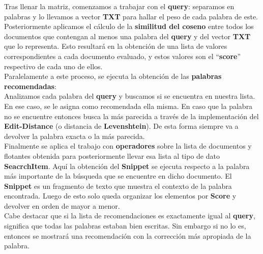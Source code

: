\documentclass[12pt,a4paper,onecolumn]{report}
\begin{document}
\begin{flushleft}
\begin{large}
Tras llenar la matriz, comenzamos a trabajar con el \textbf{query}:
separamos en palabras y lo llevamos a vector \textbf{TXT} para hallar el
peso de cada palabra de este. Posteriormente aplicamos el
cálculo de la \textbf{similitud del coseno} entre todos los documentos
que contengan al menos una palabra del \textbf{query} y del vector \textbf{TXT}
que lo representa. Esto resultará en la obtención de una lista de
valores correspondientes a cada documento evaluado, y estos
valores son el “\textbf{score}” respectivo de cada uno de ellos.\\

Paralelamente a este proceso, se ejecuta la obtención de las
\textbf{palabras recomendadas}:\\

Analizamos cada palabra del \textbf{query} y buscamos si se encuentra
en nuestra lista. En ese caso, se le asigna como recomendada ella
misma. En caso que la palabra no se encuentre entonces busca la
más parecida a través de la implementación del \textbf{Edit-Distance} (o
distancia de \textbf{Levenshtein}). De esta forma siempre va a devolver la
palabra exacta o la más parecida.\\

Finalmente se aplica el trabajo con \textbf{operadores} sobre la lista de
documentos y flotantes obtenida para posteriormente llevar esa
lista al tipo de dato \textbf{SeacrchItem}. Aquí la obtención del \textbf{Snippet}
se ejecuta respecto a la palabra más importante de la búsqueda
que se encuentre en dicho documento. El \textbf{Snippet} es un
fragmento de texto que muestra el contexto de la palabra
encontrada. Luego de esto solo queda organizar los elementos
por \textbf{Score} y devolver en orden de mayor a menor.\\

Cabe destacar que si la lista de recomendaciones es exactamente
igual al \textbf{query}, significa que todas las palabras estaban bien
escritas. Sin embargo si no lo es, entonces se mostrará una
recomendación con la corrección más apropiada de la palabra.

\end{large}

\end{flushleft}
\end{document}
